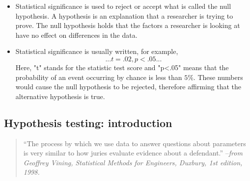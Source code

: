 \documentclass[12pt, a4paper]{article}
\begin{document}
\begin{itemize}
\item Statistical significance is used to reject or accept what is called the null hypothesis. A hypothesis is an explanation that a researcher is trying to prove. The null hypothesis holds that the factors a researcher is looking at have no effect on differences in the data. 
\item Statistical significance is usually written, for example, \[...t=.02, p<.05...\]Here, "t" stands for the statistic test score and "p<.05" means that the probability of an event occurring by chance is less than $5\%$. These numbers would cause the null hypothesis to be rejected, therefore affirming that the alternative hypothesis is true.
%
%
%



\end{itemize}


\newpage
\subsection{Hypothesis testing: introduction}

\begin{framed}
	\begin{quote}
		
		“The process by which we use data to answer questions about parameters 	
		is very similar to how juries evaluate evidence about a defendant.” –\textit{from
			Geoffrey Vining, Statistical Methods for Engineers, Duxbury, 1st edition, 1998.}
		
	\end{quote}
\end{framed}
\end{document}
